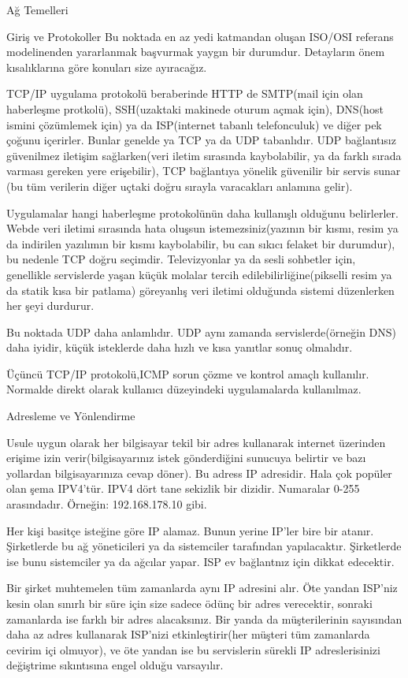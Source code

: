 \begin{section}{Ağ Temelleri}
\begin{subsection}{Giriş ve Protokoller}
Bu noktada en az yedi katmandan oluşan ISO/OSI referans modelinenden yararlanmak başvurmak yaygın bir durumdur. Detayların önem kısalıklarına göre konuları size ayıracağız.

TCP/IP uygulama protokolü beraberinde HTTP de SMTP(mail için olan haberleşme protkolü), SSH(uzaktaki makinede oturum açmak için), DNS(host ismini çözümlemek için) ya da ISP(internet tabanlı telefonculuk) ve diğer pek çoğunu içerirler. Bunlar genelde ya TCP ya da UDP tabanlıdır. UDP bağlantısız güvenilmez iletişim sağlarken(veri iletim sırasında kaybolabilir, ya da farklı sırada varması gereken yere erişebilir), TCP bağlantıya yönelik güvenilir bir servis sunar (bu tüm verilerin diğer uçtaki doğru sırayla varacakları anlamına gelir).

Uygulamalar hangi haberleşme protokolünün daha kullanışlı olduğunu belirlerler. Webde veri iletimi sırasında hata oluşsun istemezsiniz(yazının bir kısmı, resim ya da indirilen yazılımın bir kısmı kaybolabilir, bu can sıkıcı felaket bir durumdur), bu nedenle TCP doğru seçimdir. Televizyonlar ya da sesli sohbetler için, genellikle servislerde yaşan küçük molalar tercih edilebilirliğine(pikselli resim ya da statik kısa bir patlama) göreyanlış veri iletimi olduğunda sistemi düzenlerken her şeyi durdurur.

Bu noktada UDP daha anlamlıdır. UDP aynı zamanda servislerde(örneğin DNS) daha iyidir, küçük isteklerde daha hızlı ve kısa yanıtlar sonuç olmalıdır. 

Üçüncü TCP/IP protokolü,ICMP sorun çözme ve kontrol amaçlı kullanılır. Normalde direkt olarak kullanıcı düzeyindeki uygulamalarda kullanılmaz.
\end{subsection}
\begin{subsection}{Adresleme ve Yönlendirme}

Usule uygun olarak her bilgisayar tekil bir adres kullanarak internet üzerinden erişime izin verir(bilgisayarınız istek gönderdiğini sunucuya belirtir ve bazı yollardan bilgisayarınıza cevap döner). Bu adress IP adresidir. Hala çok popüler olan şema IPV4'tür. IPV4 dört tane sekizlik bir dizidir. Numaralar 0-255 arasındadır. Örneğin: 192.168.178.10 gibi. 

Her kişi basitçe isteğine göre IP alamaz. Bunun yerine IP'ler bire bir atanır. Şirketlerde bu ağ yöneticileri ya da sistemciler tarafından yapılacaktır. Şirketlerde ise bunu sistemciler ya da ağcılar yapar. ISP ev bağlantnız için dikkat edecektir.

Bir şirket muhtemelen tüm zamanlarda aynı IP adresini alır. Öte yandan ISP'niz kesin olan sınırlı bir süre için size sadece ödünç bir adres verecektir, sonraki zamanlarda ise farklı bir adres alacaksınız. Bir yanda da müşterilerinin sayısından daha az adres kullanarak ISP'nizi etkinleştirir(her müşteri tüm zamanlarda cevirim içi olmuyor), ve öte yandan ise bu servislerin sürekli IP adreslerisinizi değiştrime sıkıntısına engel olduğu varsayılır.


\end{subsection}
\end{section}
